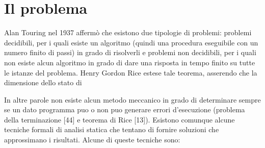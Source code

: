 \section{Il problema}
Alan Touring\cite{CITAZIONE} nel 1937 affermò che esistono due tipologie di problemi: problemi decidibili, per i quali esiste un algoritmo (quindi una procedura eseguibile con un numero finito di passi) in grado di risolverli e problemi non decidibili, per i quali non esiste alcun algoritmo in grado di dare una risposta in tempo finito su tutte le istanze del problema. Henry Gordon Rice estese tale teorema, asserendo che la dimensione dello stato di

In altre
parole non esiste alcun metodo meccanico in grado di determinare sempre se un dato
programma puo o non puo generare errori d’esecuzione (problema della terminazione
[44] e teorema di Rice [13]). Esistono comunque alcune tecniche formali di analisi
statica che tentano di fornire soluzioni che approssimano i risultati. Alcune di queste
tecniche sono:

